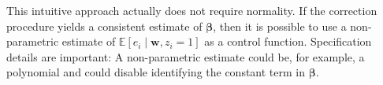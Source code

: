 \noindent This intuitive approach actually does not require normality. If the correction procedure yields a consistent estimate of $\bm{\beta}$, then it is possible to use a non-parametric estimate of $\mathbb{E} \left[ e_i \mid \bm{w}, z_i = 1 \right]$ as a control function. Specification details are important: A non-parametric estimate could be, for example, a polynomial and could disable identifying the constant term in $\bm{\beta}$. 

